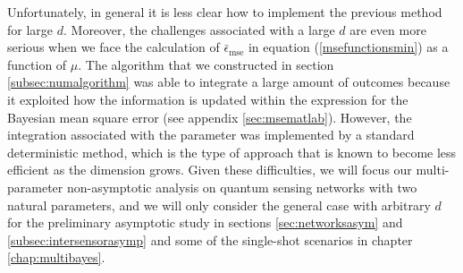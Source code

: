 Unfortunately, in general it is less clear how to implement the previous method for large $d$. Moreover, the challenges associated with a large $d$ are even more serious when we face the calculation of $\bar{\epsilon}_\mathrm{mse}$ in equation (\ref{msefunctionsmin}) as a function of $\mu$. The algorithm that we constructed in section \ref{subsec:numalgorithm} was able to integrate a large amount of outcomes because it exploited how the information is updated within the expression for the Bayesian mean square error (see appendix \ref{sec:msematlab}). However, the integration associated with the parameter was implemented by a standard deterministic method, which is the type of approach that is known to become less efficient as the dimension grows. Given these difficulties, we will focus our multi-parameter non-asymptotic analysis on quantum sensing networks with two natural parameters, and we will only consider the general case with arbitrary $d$ for the preliminary asymptotic study in sections \ref{sec:networksasym} and \ref{subsec:intersensorasymp} and some of the single-shot scenarios in chapter \ref{chap:multibayes}. 

